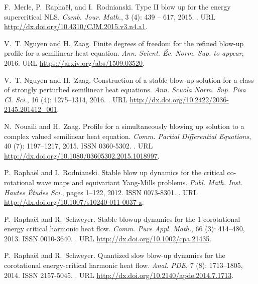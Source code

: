 \documentclass[11pt]{aims}
\theoremstyle{definition}
\numberwithin{equation}{section}
\begin{document}
\begin{thebibliography}{62}
F.~Merle, P.~Rapha{\"e}l, and I.~Rodnianski.
\newblock Type {II} blow up for the energy supercritical {NLS}.
\newblock \emph{Camb. Jour. Math.}, 3 (4): 439 -- 617, 2015.
\newblock {}.
\newblock URL \url{http://dx.doi.org/10.4310/CJM.2015.v3.n4.a1}.

V.~T. Nguyen and H.~Zaag.
\newblock Finite degrees of freedom for the refined blow-up profile for a
  semilinear heat equation.
\newblock \emph{Ann. Scient. {\'E}c. Norm. Sup. to appear}, 2016{}.
\newblock URL \url{https://arxiv.org/abs/1509.03520}.

V.~T. Nguyen and H.~Zaag.
\newblock Construction of a stable blow-up solution for a class of strongly
  perturbed semilinear heat equations.
\newblock \emph{Ann. Scuola Norm. Sup. Pisa Cl. Sci.}, 16
  (4): 1275--1314, 2016{}.
\newblock {}.
\newblock URL \url{http://dx.doi.org/10.2422/2036-2145.201412_001}.

N.~Nouaili and H.~Zaag.
\newblock Profile for a simultaneously blowing up solution to a complex valued
  semilinear heat equation.
\newblock \emph{Comm. Partial Differential Equations}, 40
  (7): 1197--1217, 2015.
\newblock ISSN 0360-5302.
\newblock {}.
\newblock URL \url{http://dx.doi.org/10.1080/03605302.2015.1018997}.

P.~Rapha{\"e}l and I.~Rodnianski.
\newblock Stable blow up dynamics for the critical co-rotational wave maps and
  equivariant {Y}ang-{M}ills problems.
\newblock \emph{Publ. Math. Inst. Hautes \'Etudes Sci.}, pages 1--122, 2012.
\newblock ISSN 0073-8301.
\newblock {}.
\newblock URL \url{http://dx.doi.org/10.1007/s10240-011-0037-z}.

P.~Rapha{\"e}l and R.~Schweyer.
\newblock Stable blowup dynamics for the 1-corotational energy critical
  harmonic heat flow.
\newblock \emph{Comm. Pure Appl. Math.}, 66 (3): 414--480,
  2013.
\newblock ISSN 0010-3640.
\newblock {}.
\newblock URL \url{http://dx.doi.org/10.1002/cpa.21435}.

P.~Rapha{\"e}l and R.~Schweyer.
\newblock Quantized slow blow-up dynamics for the corotational energy-critical
  harmonic heat flow.
\newblock \emph{Anal. PDE}, 7 (8): 1713--1805,
  2014{}.
\newblock ISSN 2157-5045.
\newblock {}.
\newblock URL \url{http://dx.doi.org/10.2140/apde.2014.7.1713}.


\end{thebibliography}
\end{document}
